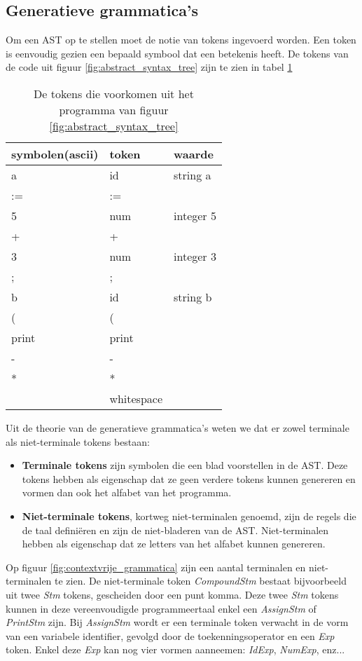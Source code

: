 \subsection{Generatieve grammatica's}
Om een AST op te stellen moet de notie van tokens ingevoerd worden. Een token is eenvoudig gezien een bepaald symbool dat een betekenis heeft. De tokens van de code uit figuur \ref{fig:abstract_syntax_tree} zijn te zien in tabel \ref{table:tokens}
\begin{table}[h]
	\centering
	\begin{tabular}{l | l | l}
		symbolen(ascii) & token & waarde \\
		\hline
		a & id & string a \\
		:= & := & \\
		5 & num & integer 5 \\
		+ & + & \\
		3 & num & integer 3 \\
		; & ; & \\
		b & id & string b \\
		( & ( & \\
		print & print & \\
		- & - & \\
		* & * & \\
		  & whitespace & \\
	\end{tabular}
	\caption{De tokens die voorkomen uit het programma van figuur \ref{fig:abstract_syntax_tree}}
	\label{table:tokens}
\end{table}
Uit de theorie van de generatieve grammatica's weten we dat er zowel terminale als niet-terminale tokens bestaan:
\begin{itemize}
	\item \textbf{Terminale tokens} zijn symbolen die een blad voorstellen in de AST. Deze tokens hebben als eigenschap dat ze geen verdere tokens kunnen genereren en vormen dan ook het alfabet van het programma.
	\item \textbf{Niet-terminale tokens}, kortweg niet-terminalen genoemd, zijn de regels die de taal definiëren en zijn de niet-bladeren van de AST. Niet-terminalen hebben als eigenschap dat ze letters van het alfabet kunnen genereren.
\end{itemize}
Op figuur \ref{fig:contextvrije_grammatica} zijn een aantal terminalen en niet-terminalen te zien. De niet-terminale token \textit{CompoundStm} bestaat bijvoorbeeld uit twee \textit{Stm} tokens, gescheiden door een punt komma. Deze twee \textit{Stm} tokens kunnen in deze vereenvoudigde programmeertaal enkel een \textit{AssignStm} of \textit{PrintStm} zijn. Bij \textit{AssignStm} wordt er een terminale token verwacht in de vorm van een variabele identifier, gevolgd door de toekenningsoperator en een \textit{Exp} token. Enkel deze \textit{Exp} kan nog vier vormen aanneemen: \textit{IdExp}, \textit{NumExp}, enz...

